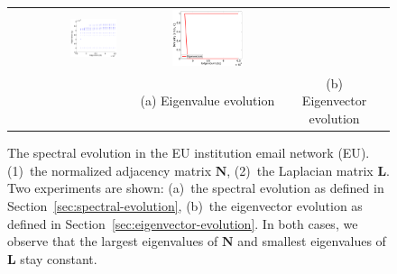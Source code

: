 \documentclass[11pt,a4paper]{book}
\newcommand{\wTwoMinusLabel}{0.45}
\begin{document}
\begin{figure}[h!]
\begin{tabular}{rccc}
    \includegraphics[width=\wTwoMinusLabel\textwidth]{img-st/time.spectrum-flat.laps.epinions} &
    \includegraphics[width=\wTwoMinusLabel\textwidth]{img-st/time.eigenvalue_evolution.laps.epinions}  \\
    & (a) Eigenvalue evolution & (b) Eigenvector evolution 
  \end{tabular}
  \caption{
    The spectral evolution in the EU institution email network
    (\textsf{EU}).   
    (1)~the normalized adjacency matrix $\mathbf N$,
    (2)~the Laplacian matrix $\mathbf L$. 
    Two experiments are shown:
    (a)~the spectral evolution as defined in
    Section~\ref{sec:spectral-evolution},
    (b)~the eigenvector evolution as defined in
    Section~\ref{sec:eigenvector-evolution}. 
    In both cases, we observe that the largest eigenvalues of $\mathbf
    N$ and smallest eigenvalues of $\mathbf L$ stay constant. 
  }
  \label{fig:laplacian-evolution}
\end{figure}
\end{document}
